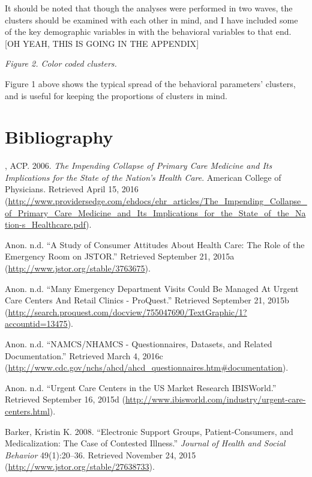 \documentclass[12pt,twoside]{reedthesis}
\begin{document}
  It should be noted that though the analyses were performed in two waves,
  the clusters should be examined with each other in mind, and I have
  included some of the key demographic variables in with the behavioral
  variables to that end. {[}OH YEAH, THIS IS GOING IN THE APPENDIX{]}
  
  \emph{Figure 2. Color coded clusters.}
  
  Figure 1 above shows the typical spread of the behavioral parameters'
  clusters, and is useful for keeping the proportions of clusters in mind.
  
  \backmatter
  
  \chapter*{Bibliography}\label{bibliography}
  
  \noindent
  \setlength{\parindent}{-0.20in} \setlength{\leftskip}{0.20in}
  \setlength{\parskip}{8pt}
  
  , ACP. 2006. \emph{The Impending Collapse of Primary Care Medicine and
  Its Implications for the State of the Nation's Health Care}. American
  College of Physicians. Retrieved April 15, 2016
  (\url{http://www.providersedge.com/ehdocs/ehr_articles/The_Impending_Collapse_of_Primary_Care_Medicine_and_Its_Implications_for_the_State_of_the_Nation-s_Healthcare.pdf}).
  
  Anon. n.d. ``A Study of Consumer Attitudes About Health Care: The Role
  of the Emergency Room on JSTOR.'' Retrieved September 21, 2015a
  (\url{http://www.jstor.org/stable/3763675}).
  
  Anon. n.d. ``Many Emergency Department Visits Could Be Managed At Urgent
  Care Centers And Retail Clinics - ProQuest.'' Retrieved September 21,
  2015b
  (\url{http://search.proquest.com/docview/755047690/TextGraphic/1?accountid=13475}).
  
  Anon. n.d. ``NAMCS/NHAMCS - Questionnaires, Datasets, and Related
  Documentation.'' Retrieved March 4, 2016c
  (\url{http://www.cdc.gov/nchs/ahcd/ahcd_questionnaires.htm\#documentation}).
  
  Anon. n.d. ``Urgent Care Centers in the US Market Research IBISWorld.''
  Retrieved September 16, 2015d
  (\url{http://www.ibisworld.com/industry/urgent-care-centers.html}).
  
  Barker, Kristin K. 2008. ``Electronic Support Groups, Patient-Consumers,
  and Medicalization: The Case of Contested Illness.'' \emph{Journal of
  Health and Social Behavior} 49(1):20--36. Retrieved November 24, 2015
  (\url{http://www.jstor.org/stable/27638733}).
  
\end{document}
